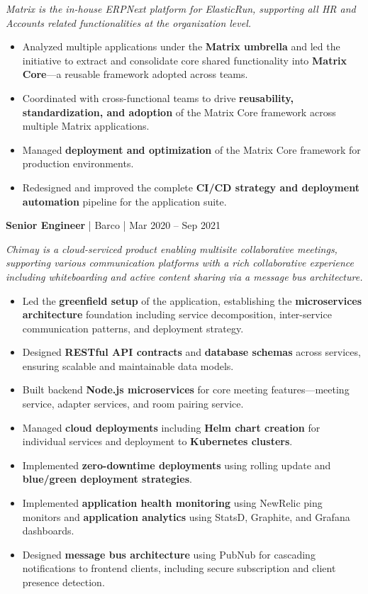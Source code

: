 \documentclass[a4paper,11pt]{article}
\newcommand{\jobtitle}[4]{
  \vspace{6pt}
  {\textbf{\textcolor{accent}{#1}} | #2 | #3}
  \vspace{2pt}
}
\begin{document}
\textit{Matrix is the in-house ERPNext platform for ElasticRun, supporting all HR and Accounts related functionalities at the organization level.}

\begin{itemize}[leftmargin=*, nosep]
  \item Analyzed multiple applications under the \textbf{Matrix umbrella} and led the initiative to extract and consolidate core shared functionality into \textbf{Matrix Core}---a reusable framework adopted across teams.
  \item Coordinated with cross-functional teams to drive \textbf{reusability, standardization, and adoption} of the Matrix Core framework across multiple Matrix applications.
  \item Managed \textbf{deployment and optimization} of the Matrix Core framework for production environments.
  \item Redesigned and improved the complete \textbf{CI/CD strategy and deployment automation} pipeline for the application suite.
\end{itemize}

\vspace{8pt}
\jobtitle{Senior Engineer}{Barco}{Mar 2020 -- Sep 2021}{}

\textit{Chimay is a cloud-serviced product enabling multisite collaborative meetings, supporting various communication platforms with a rich collaborative experience including whiteboarding and active content sharing via a message bus architecture.}

\begin{itemize}[leftmargin=*, nosep]
  \item Led the \textbf{greenfield setup} of the application, establishing the \textbf{microservices architecture} foundation including service decomposition, inter-service communication patterns, and deployment strategy.
  \item Designed \textbf{RESTful API contracts} and \textbf{database schemas} across services, ensuring scalable and maintainable data models.
  \item Built backend \textbf{Node.js microservices} for core meeting features---meeting service, adapter services, and room pairing service.
  \item Managed \textbf{cloud deployments} including \textbf{Helm chart creation} for individual services and deployment to \textbf{Kubernetes clusters}.
  \item Implemented \textbf{zero-downtime deployments} using rolling update and \textbf{blue/green deployment strategies}.
  \item Implemented \textbf{application health monitoring} using NewRelic ping monitors and \textbf{application analytics} using StatsD, Graphite, and Grafana dashboards.
  \item Designed \textbf{message bus architecture} using PubNub for cascading notifications to frontend clients, including secure subscription and client presence detection.
\end{itemize}
\end{document}
